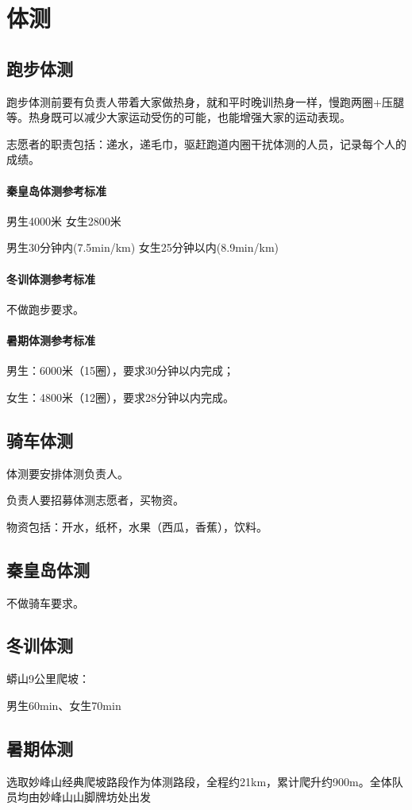 \documentclass{ctexbook}
\begin{document}
\section{体测}

\subsection{跑步体测}
跑步体测前要有负责人带着大家做热身，就和平时晚训热身一样，慢跑两圈+压腿等。热身既可以减少大家运动受伤的可能，也能增强大家的运动表现。

志愿者的职责包括：递水，递毛巾，驱赶跑道内圈干扰体测的人员，记录每个人的成绩。
\paragraph{秦皇岛体测参考标准}

男生4000米 女生2800米

男生30分钟内(7.5min/km) 女生25分钟以内(8.9min/km)
\paragraph{冬训体测参考标准}
不做跑步要求。
\paragraph{暑期体测参考标准}
男生：6000米（15圈），要求30分钟以内完成；

女生：4800米（12圈），要求28分钟以内完成。


\subsection{骑车体测}

体测要安排体测负责人。

负责人要招募体测志愿者，买物资。

物资包括：开水，纸杯，水果（西瓜，香蕉），饮料。

\subsection{秦皇岛体测}
不做骑车要求。
\subsection{冬训体测}
蟒山9公里爬坡：

男生60min、女生70min
\subsection{暑期体测}
选取妙峰山经典爬坡路段作为体测路段，全程约21km，累计爬升约900m。全体队员均由妙峰山山脚牌坊处出发
\end{document}
